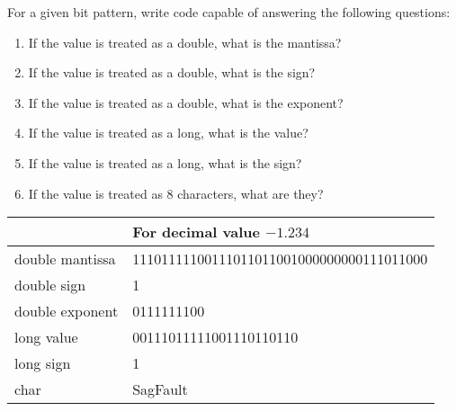 \documentclass[letterpaper,12pt,titlepage]{article}
\begin{document}
For a given bit pattern, write code capable of answering the following questions:
\begin{enumerate}
\item[]If the value is treated as a double, what is the mantissa?

\item[]If the value is treated as a double, what is the sign?

\item[]If the value is treated as a double, what is the exponent?

\item[]If the value is treated as a long, what is the value?

\item[]If the value is treated as a long, what is the sign?

\item[]If the value is treated as 8 characters, what are they?



\end{enumerate}

\begin{center}
\begin{tabular} {| l | l | }
\hline
\multicolumn{2}{|c|}{\textbf{For decimal value $-1.234$}} \\
\hline
double mantissa & 11101111100111011011001000000000111011000 \\
double sign & 1 \\
double exponent & 0111111100\\
long value & 00111011111001110110110\\
long sign & 1\\
char & SagFault\\ \hline
\end{tabular}
\end{center}


\end{document}
